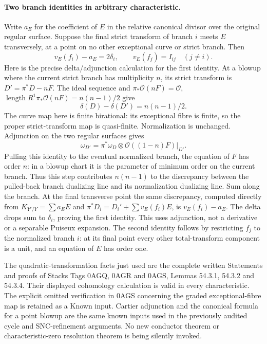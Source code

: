 \paragraph{Two branch identities in arbitrary characteristic.}
Write $a_E$ for the coefficient of $E$ in the relative canonical divisor
over the original regular surface.  Suppose the final strict transform
of branch $i$ meets $E$ transversely, at a point on no other exceptional
curve or strict branch.  Then
\[
 v_E(f_i)-a_E=2\delta_i,\qquad
 v_E(f_j)=I_{ij}\quad(j\ne i).                       \tag{D.WS.2}
\]
Here is the precise delta/adjunction calculation for the first identity.
At a blowup where the current strict branch has multiplicity $n$, its
strict transform is $D'=\pi^*D-nF$.  The ideal sequence and
$\pi_*\mathcal O(nF)=\mathcal O$,
$\operatorname{length}R^1\pi_*\mathcal O(nF)=n(n-1)/2$
give
\[
 \delta(D)-\delta(D')=n(n-1)/2.
\]
The curve map here is finite birational: its exceptional fibre is finite,
so the proper strict-transform map is quasi-finite.  Normalization is
unchanged.  Adjunction on the two regular surfaces gives
\[
 \omega_{D'}=\pi^*\omega_D\otimes
                         \mathcal O((1-n)F)|_{D'}.
\]
Pulling this identity to the eventual normalized branch, the equation
of $F$ has order $n$: in a blowup chart it is the parameter of minimum
order on the current branch.  Thus this step contributes $n(n-1)$ to
the discrepancy between the pulled-back branch dualizing line and its
normalization dualizing line.  Sum along the branch.  At the final
transverse point the same discrepancy, computed directly from
$K_{Y'/Y}=\sum a_EE$ and
$\pi^*D_i=D_i'+\sum v_E(f_i)E$, is $v_E(f_i)-a_E$.
The delta drops sum to $\delta_i$, proving the first identity.
This uses adjunction, not a derivative or a separable Puiseux expansion.
The second identity follows by restricting $f_j$ to the normalized
branch $i$: at its final point every other total-transform component
is a unit, and an equation of $E$ has order one.

The quadratic-transformation facts just used are the complete written
Statements and proofs of Stacks Tags 0AGQ, 0AGR and 0AGS, Lemmas
54.3.1, 54.3.2 and 54.3.4.  Their displayed cohomology calculation is
valid in every characteristic.  The explicit omitted verification in
0AGS concerning the graded exceptional-fibre map is retained as a
Known input.  Cartier adjunction and the canonical formula for a point
blowup are the same known inputs used in the previously audited cycle
and SNC-refinement arguments.  No new conductor theorem or
characteristic-zero resolution theorem is being silently invoked.

